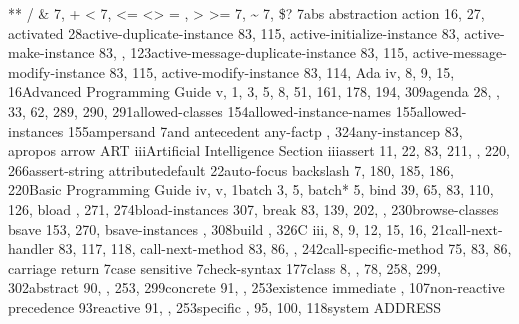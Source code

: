 \documentclass[letterpaper,10pt,english]{sphinxmanual}
\begin{document}
** / \& 7, + \textless{} 7, \textless{}=
\textless{}\textgreater{} = ,  \textgreater{} \textgreater{}= \textbar{}
7, \textasciitilde{} 7, \$? 7abs abstraction action 16,
27, activated 28active-duplicate-instance 83, 115,
active-initialize-instance 83, active-make-instance
83, , 123active-message-duplicate-instance 83, 115,
active-message-modify-instance 83, 115,
active-modify-instance 83, 114, Ada iv, 8, 9, 15,
16Advanced Programming Guide v, 1, 3, 5, 8, 51, 161, 178, 194, 309agenda
28, , 33, 62, 289, 290, 291allowed-classes
154allowed-instance-names 155allowed-instances 155ampersand 7and
antecedent any-factp , 324any-instancep 83,
apropos arrow ART iiiArtificial Intelligence
Section iiiassert 11, 22, 83, 211, , 220, 266assert-string
attributedefault 22auto-focus backslash 7, 180, 185,
186, 220Basic Programming Guide iv, v, 1batch 3, 5, batch* 5,
bind 39, 65, 83, 110, 126, bload , 271,
274bload-instances 307, break 83, 139, 202, ,
230browse-classes bsave 153, 270, bsave-instances
, 308build , 326C iii, 8, 9, 12, 15, 16,
21call-next-handler 83, 117, 118, call-next-method 83, 86,
, 242call-specific-method 75, 83, 86, carriage return
7case sensitive 7check-syntax 177class 8, , 78, 258, 299,
302abstract 90, , 253, 299concrete 91, , 253existence
immediate , 107non-reactive precedence 93reactive
91, , 253specific , 95, 100, 118system ADDRESS
\end{document}

